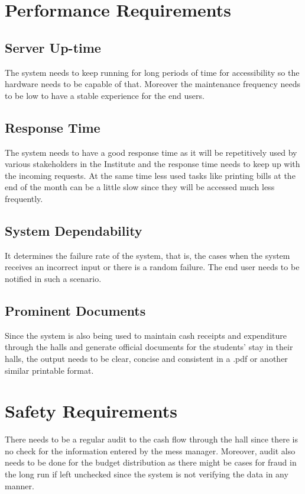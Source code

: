 \documentclass{scrreprt}
\begin{document}
\section{Performance Requirements}
\subsection{Server Up-time}
The system needs to keep running for long periods of time for accessibility so the hardware needs to be capable of that. Moreover the maintenance frequency needs to be low to have a stable experience for the end users.\subsection{Response Time}
The system needs to have a good response time as it will be repetitively used by various stakeholders in the Institute and the response time needs to keep up with the incoming requests. At the same time less used tasks like printing bills at the end of the month can be a little slow since they will be accessed much less frequently.
\subsection{System Dependability}
It determines the failure rate of the system, that is, the cases when the system receives an incorrect input or there is a random failure. The end user needs to be notified in such a scenario.
\subsection{Prominent Documents}
Since the system is also being used to maintain cash receipts and expenditure through the halls and generate official documents for the students' stay in their halls, the output needs to be clear, concise and consistent in a .pdf or another similar printable format.



\section{Safety Requirements}
There needs to be a regular audit to the cash flow through the hall since there is no check for the information entered by the mess manager. Moreover, audit also needs to be done for the budget distribution as there might be cases for fraud in the long run if left unchecked since the system is not verifying the data in any manner.
\end{document}
